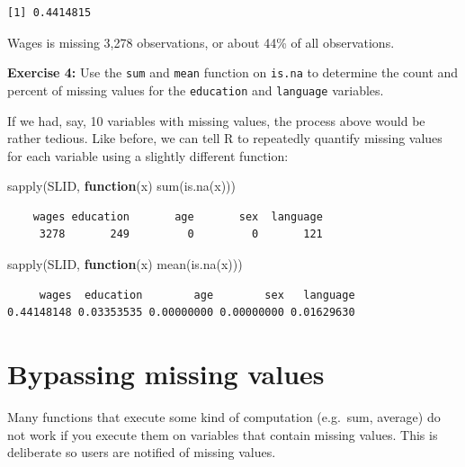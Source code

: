 \documentclass[
]{book}
\makeatletter
\newenvironment{Shaded}{\begin{snugshade}}{\end{snugshade}}
\newcommand{\ControlFlowTok}[1]{\textcolor[rgb]{0.27,0.27,0.27}{\textbf{#1}}}
\newcommand{\FunctionTok}[1]{\textcolor[rgb]{0,0,0}{#1}}
\newcommand{\NormalTok}[1]{#1}
\newenvironment{kframe}{%
\medskip{}
\setlength{\fboxsep}{.8em}
 \def\at@end@of@kframe{}%
 \ifinner\ifhmode%
  \def\at@end@of@kframe{\end{minipage}}%
  \begin{minipage}{\columnwidth}%
 \fi\fi%
 \def\FrameCommand##1{\hskip\@totalleftmargin \hskip-\fboxsep
 \colorbox{shadecolor}{##1}\hskip-\fboxsep
     \hskip-\linewidth \hskip-\@totalleftmargin \hskip\columnwidth}%
 \MakeFramed {\advance\hsize-\width
   \@totalleftmargin\z@ \linewidth\hsize
   \@setminipage}}%
 {\par\unskip\endMakeFramed%
 \at@end@of@kframe}
\renewenvironment{Shaded}{\begin{kframe}}{\end{kframe}}
\newenvironment{rmdblock}[1]
  {\begin{shaded*}
  }
  {\end{shaded*}
  }
\newenvironment{learncheck}
  {\begin{rmdblock}{warning}}
  {\end{rmdblock}}
\makeatother
\begin{document}
\begin{verbatim}
[1] 0.4414815
\end{verbatim}

Wages is missing 3,278 observations, or about 44\% of all observations.

\begin{learncheck}
\textbf{Exercise 4:} Use the \texttt{sum} and \texttt{mean} function on
\texttt{is.na} to determine the count and percent of missing values for
the \texttt{education} and \texttt{language} variables.
\end{learncheck}

If we had, say, 10 variables with missing values, the process above would be rather tedious. Like before, we can tell R to repeatedly quantify missing values for each variable using a slightly different function:

\begin{Shaded}
\begin{Highlighting}[]
\FunctionTok{sapply}\NormalTok{(SLID, }\ControlFlowTok{function}\NormalTok{(x) }\FunctionTok{sum}\NormalTok{(}\FunctionTok{is.na}\NormalTok{(x)))}
\end{Highlighting}
\end{Shaded}

\begin{verbatim}
    wages education       age       sex  language 
     3278       249         0         0       121 
\end{verbatim}

\begin{Shaded}
\begin{Highlighting}[]
\FunctionTok{sapply}\NormalTok{(SLID, }\ControlFlowTok{function}\NormalTok{(x) }\FunctionTok{mean}\NormalTok{(}\FunctionTok{is.na}\NormalTok{(x)))}
\end{Highlighting}
\end{Shaded}

\begin{verbatim}
     wages  education        age        sex   language 
0.44148148 0.03353535 0.00000000 0.00000000 0.01629630 
\end{verbatim}

\hypertarget{bypassing-missing-values}{%
\section{Bypassing missing values}\label{bypassing-missing-values}}

Many functions that execute some kind of computation (e.g.~sum, average) do not work if you execute them on variables that contain missing values. This is deliberate so users are notified of missing values.
\end{document}
